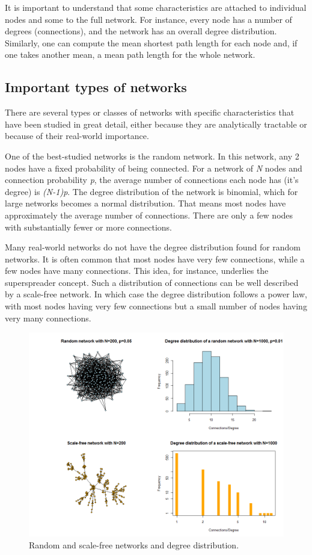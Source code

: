 \documentclass[]{article}
\theoremstyle{definition}
\theoremstyle{definition}
\theoremstyle{definition}
\theoremstyle{remark}
\begin{document}
It is important to understand that some characteristics are attached to
individual nodes and some to the full network. For instance, every node
has a number of degrees (connections), and the network has an overall
degree distribution. Similarly, one can compute the mean shortest path
length for each node and, if one takes another mean, a mean path length
for the whole network.

\subsection{Important types of
networks}\label{important-types-of-networks}

There are several types or classes of networks with specific
characteristics that have been studied in great detail, either because
they are analytically tractable or because of their real-world
importance.

One of the best-studied networks is the random network. In this network,
any 2 nodes have a fixed probability of being connected. For a network
of \emph{N} nodes and connection probability \emph{p}, the average
number of connections each node has (it's degree) is \emph{(N-1)p}. The
degree distribution of the network is binomial, which for large networks
becomes a normal distribution. That means most nodes have approximately
the average number of connections. There are only a few nodes with
substantially fewer or more connections.

Many real-world networks do not have the degree distribution found for
random networks. It is often common that most nodes have very few
connections, while a few nodes have many connections. This idea, for
instance, underlies the superspreader concept. Such a distribution of
connections can be well described by a scale-free network. In which case
the degree distribution follows a power law, with most nodes having very
few connections but a small number of nodes having very many
connections.

\begin{figure}
\centering
\includegraphics{./images/network-examples.png}
\caption{Random and scale-free networks and degree distribution.}
\end{figure}
\end{document}
